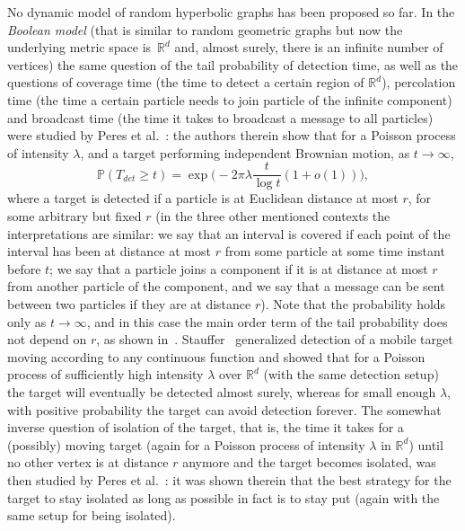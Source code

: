 \documentclass[12pt]{article}
\newcommand{\RR}{\mathbb{R}}
\renewcommand{\P}{\mathbb{P}}
\begin{document}
No dynamic model of random hyperbolic graphs has been proposed so far. In the \emph{Boolean model} (that is similar to random geometric graphs but now the underlying metric space is~$\RR^d$ and, almost surely, there is an infinite number of vertices)
the same question  of the tail probability of detection time, as well as the questions of coverage time (the time to detect a certain region of $\mathbb{R}^d$), percolation time (the time a certain particle needs to join particle of the infinite component) and broadcast time (the time it takes to broadcast a message to all particles) were studied by Peres et al.~\cite{Peres2010}: the authors therein show that for a Poisson process of intensity $\lambda$, and a target performing independent Brownian motion, as $t \to \infty$, 
$$
\P{(T_{det} \ge t)} = \exp\Big(- 2\pi \lambda\frac{t}{\log t}(1+o(1))\Big),
$$
where a target is detected if a particle is at Euclidean distance at most $r$, for some arbitrary but fixed $r$ (in the three other mentioned contexts the interpretations are similar: we say that an interval is covered if each point of the interval has been at distance at most $r$ from some particle at some time instant before $t$; we say that a particle joins a component if it is at distance at most $r$ from another particle of the component, and we say that a message can be sent between two particles if they are at distance $r$). Note that the probability holds only as $t \to \infty$, and in this case the main order term of the tail probability does not depend on $r$, as shown in~\cite{Peres2010}. Stauffer~\cite{Stauffer} generalized detection of a mobile target moving according to any continuous function and showed that for a Poisson process of sufficiently high intensity $\lambda$ over $\mathbb{R}^d$ (with the same detection setup) the target will eventually be detected almost surely, whereas for small enough $\lambda$, with positive probability the target can avoid detection forever. The somewhat inverse question of isolation of the target, that is, the time it takes for a (possibly) moving target (again for a Poisson process of intensity $\lambda$ in $\mathbb{R}^d$) until no other vertex is at distance $r$ anymore and the target becomes isolated, was then studied by Peres et al.~\cite{Isolation}: it was shown therein that the best strategy for the target to stay isolated as long as possible in fact is to stay put (again with the same setup for being isolated).
\end{document}
